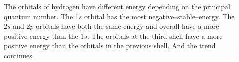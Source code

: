 \documentclass[main.tex]{subfiles}
\begin{document}
\begin{description}
%  
%    
%
%
%

\item[] 
The orbitals of hydrogen have different energy depending on the principal quantum number. The 1$s$ orbital has the most negative--stable--energy. The 2$s$ and 2$p$ orbitals have both the same energy and overall have a more positive energy than the 1$s$. The orbitals at the third shell have a more positive energy than the orbitals in the previous shell. And the trend continues.


\end{description}
\end{document}
